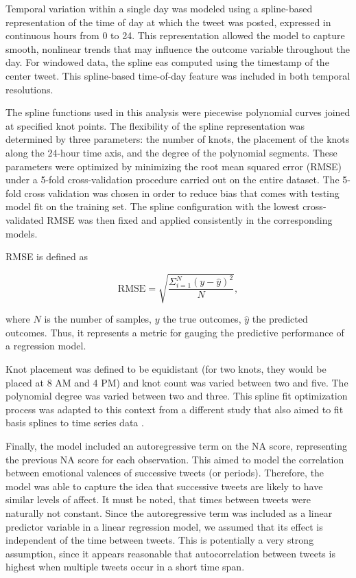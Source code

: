 Temporal variation within a single day was modeled using a spline-based representation of the time of day at which the tweet was posted, expressed in continuous hours from 0 to 24. This representation allowed the model to capture smooth, nonlinear trends that may influence the outcome variable throughout the day. For windowed data, the spline eas computed using the timestamp of the center tweet. This spline-based time-of-day feature was included in both temporal resolutions.

The spline functions used in this analysis were piecewise polynomial curves joined at specified knot points. The flexibility of the spline representation was determined by three parameters: the number of knots, the placement of the knots along the 24-hour time axis, and the degree of the polynomial segments. These parameters were optimized by minimizing the root mean squared error (RMSE) under a 5-fold cross-validation procedure carried out on the entire dataset. The 5-fold cross validation was chosen in order to reduce bias that comes with testing model fit on the training set. The spline configuration with the lowest cross-validated RMSE was then fixed and applied consistently in the corresponding models.

RMSE is defined as 

\begin{equation}
    \mathrm{RMSE} = \sqrt{\frac{\Sigma_{i=1}^N (y - \hat{y})^2}{N}},
\end{equation}

where $N$ is the number of samples, $y$ the true outcomes, $\hat{y}$ the predicted outcomes. Thus, it represents a metric for gauging the predictive performance of a regression model.


Knot placement was defined to be equidistant (for two knots, they would be placed at 8 AM and 4 PM) and knot count was varied between two and five. The polynomial degree was varied between two and three. This spline fit optimization process was adapted to this context from a different study that also aimed to fit basis splines to time series data \citep{octpaper}.



Finally, the model included an autoregressive term on the NA score, representing the previous NA score for each observation. This aimed to model the correlation between emotional valences of successive tweets (or periods). Therefore, the model was able to capture the idea that successive tweets are likely to have similar levels of affect. It must be noted, that times between tweets were naturally not constant. Since the autoregressive term was included as a linear predictor variable in a linear regression model, we assumed that its effect is independent of the time between tweets. This is potentially a very strong assumption, since it appears reasonable that autocorrelation between tweets is highest when multiple tweets occur in a short time span.

